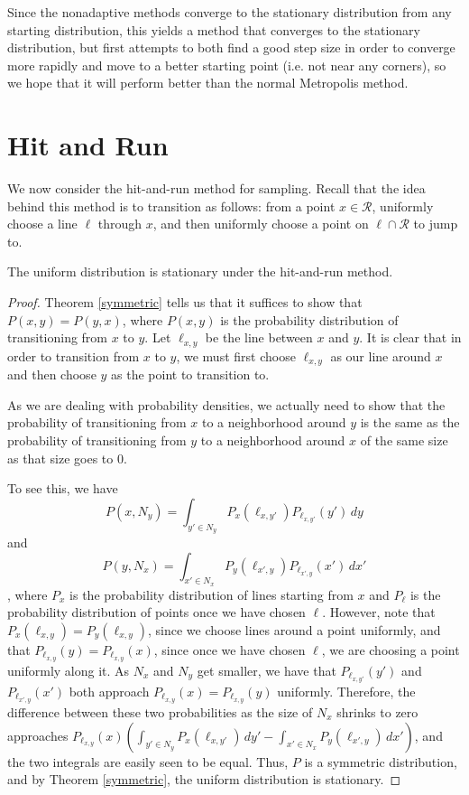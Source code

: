 \documentclass[11pt]{article}
\begin{document}
Since the nonadaptive methods converge to the stationary distribution from any starting distribution, this yields a method that converges to the stationary distribution, but first attempts to both find a good step size in order to converge more rapidly and move to a better starting point (i.e. not near any corners), so we hope that it will perform better than the normal Metropolis method.

\section{Hit and Run}\label{hitandrunsection}

We now consider the hit-and-run method for sampling. Recall that the idea behind this method is to transition as follows: from a point $x \in \mathcal{R}$, uniformly choose a line $\ell$ through $x$, and then uniformly choose a point on $\ell \cap \mathcal{R}$ to jump to.

\begin{prop}
The uniform distribution is stationary under the hit-and-run method.
\end{prop}
\begin{proof}
Theorem \ref{symmetric} tells us that it suffices to show that $P(x,y) = P(y,x)$, where $P(x,y)$ is the probability distribution of transitioning from $x$ to $y$. Let $\ell_{x,y}$ be the line between $x$ and $y$. It is clear that in order to transition from $x$ to $y$, we must first choose $\ell_{x,y}$ as our line around $x$ and then choose $y$ as the point to transition to. 

As we are dealing with probability densities, we actually need to show that the probability of transitioning from $x$ to a neighborhood around $y$ is the same as the probability of transitioning from $y$ to a neighborhood around $x$ of the same size as that size goes to $0$.

To see this, we have $$P(x,N_y) = \int_{y' \in N_y}P_x(\ell_{x,y'})P_{\ell_{x,y'}}(y')\,dy$$ and $$P(y,N_x) = \int_{x'\in N_x}P_y(\ell_{x',y})P_{\ell_{x',y}}(x')\,dx'$$, where $P_x$ is the probability distribution of lines starting from $x$ and $P_\ell$ is the probability distribution of points once we have chosen $\ell$. However, note that $P_x(\ell_{x,y}) = P_y(\ell_{x,y})$, since we choose lines around a point uniformly, and that $P_{\ell_{x,y}}(y) = P_{\ell_{x,y}}(x)$, since once we have chosen $\ell$, we are choosing a point uniformly along it. As $N_x$ and $N_y$ get smaller, we have that $P_{\ell_{x,y'}}(y')$ and $P_{\ell_{x',y}}(x')$ both approach $P_{\ell_{x,y}}(x) = P_{\ell_{x,y}}(y)$ uniformly. Therefore, the difference between these two probabilities as the size of $N_x$ shrinks to zero approaches $P_{\ell_{x,y}}(x)\left(\int_{y' \in N_y}P_x(\ell_{x,y'})\,dy' - \int_{x' \in N_x}P_y(\ell_{x',y})\,dx'\right)$, and the two integrals are easily seen to be equal. Thus, $P$ is a symmetric distribution, and by Theorem \ref{symmetric}, the uniform distribution is stationary.
\end{proof}
\end{document}
